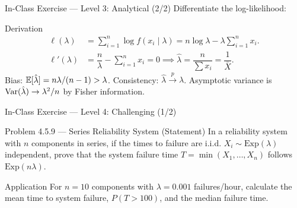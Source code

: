 \documentclass[aspectratio=169,xcolor={dvipsnames,table}]{beamer}
\begin{document}
\begin{frame}{In-Class Exercise --- Level 3: Analytical (2/2)}
	\vspace{-0.05cm}
	\scriptsize
	Differentiate the log-likelihood: \pause
	\begin{block}{Derivation}
		\scriptsize
		\begin{align*}
			\ell(\lambda) &= \sum_{i=1}^{n} \log f(x_i \mid \lambda) = n \log \lambda - \lambda \sum_{i=1}^{n} x_i. \\
			\ell'(\lambda) &= \dfrac{n}{\lambda} - \sum_{i=1}^{n} x_i = 0 \implies \hat{\lambda} = \dfrac{n}{\sum x_i} = \dfrac{1}{\bar{X}}.
		\end{align*}
		Bias: $\mathbb{E}[\hat{\lambda}] = n\lambda/(n-1) > \lambda$. Consistency: $\hat{\lambda} \xrightarrow{p} \lambda$. Asymptotic variance is $\operatorname{Var}(\hat{\lambda}) \to \lambda^{2}/n$ by Fisher information. \quad \qedhere
	\end{block}
\end{frame}

\begin{frame}{In-Class Exercise --- Level 4: Challenging (1/2)}
	\vspace{-0.1cm}
	\begin{block}{Problem 4.5.9 --- Series Reliability System (Statement)}
		In a reliability system with $n$ components in series, if the times to failure are i.i.d. $X_{i} \sim \text{Exp}(\lambda)$ independent, prove that the system failure time $T = \min(X_{1}, \dots, X_{n})$ follows $\text{Exp}(n\lambda)$.
	\end{block}
	\vspace{0.15cm}
	\pause
	\begin{alertblock}{Application}
		\scriptsize
		For $n = 10$ components with $\lambda = 0.001$ failures/hour, calculate the mean time to system failure, $P(T > 100)$, and the median failure time.
	\end{alertblock}
\end{frame}
\end{document}
